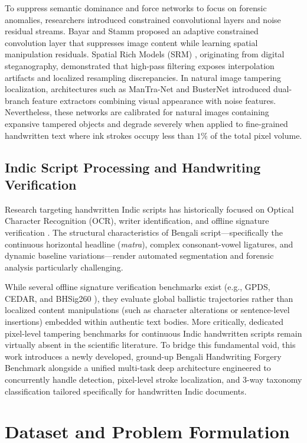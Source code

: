 \documentclass[runningheads]{llncs}
\begin{document}
To suppress semantic dominance and force networks to focus on forensic anomalies, researchers introduced constrained convolutional layers and noise residual streams. Bayar and Stamm \cite{bib7} proposed an adaptive constrained convolution layer that suppresses image content while learning spatial manipulation residuals. Spatial Rich Models (SRM) \cite{bib8}, originating from digital steganography, demonstrated that high-pass filtering exposes interpolation artifacts and localized resampling discrepancies. In natural image tampering localization, architectures such as ManTra-Net \cite{bib9} and BusterNet \cite{bib10} introduced dual-branch feature extractors combining visual appearance with noise features. Nevertheless, these networks are calibrated for natural images containing expansive tampered objects and degrade severely when applied to fine-grained handwritten text where ink strokes occupy less than $1\%$ of the total pixel volume.

\subsection{Indic Script Processing and Handwriting Verification}\label{subsec2_3}
Research targeting handwritten Indic scripts has historically focused on Optical Character Recognition (OCR), writer identification, and offline signature verification \cite{bib2,bib11,bib12}. The structural characteristics of Bengali script---specifically the continuous horizontal headline (\textit{matra}), complex consonant-vowel ligatures, and dynamic baseline variations---render automated segmentation and forensic analysis particularly challenging.

While several offline signature verification benchmarks exist (e.g., GPDS, CEDAR, and BHSig260 \cite{bib13}), they evaluate global ballistic trajectories rather than localized content manipulations (such as character alterations or sentence-level insertions) embedded within authentic text bodies. More critically, dedicated pixel-level tampering benchmarks for continuous Indic handwritten scripts remain virtually absent in the scientific literature. To bridge this fundamental void, this work introduces a newly developed, ground-up Bengali Handwriting Forgery Benchmark alongside a unified multi-task deep architecture engineered to concurrently handle detection, pixel-level stroke localization, and 3-way taxonomy classification tailored specifically for handwritten Indic documents.

\section{Dataset and Problem Formulation}\label{sec3}
\end{document}
